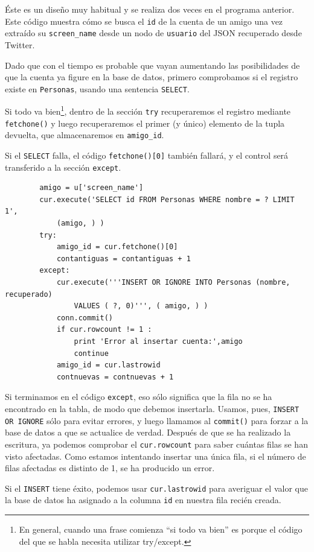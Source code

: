Éste es un diseño muy habitual y se realiza dos veces en el programa anterior.
Este código muestra cómo se busca el {\tt id} de la
cuenta de un amigo una vez extraído su \verb"screen_name"
desde un nodo de {\tt usuario} del JSON recuperado desde Twitter.

Dado que con el tiempo es probable que vayan aumentando las posibilidades de que la cuenta
ya figure en la base de datos, primero comprobamos si el registro
existe en {\tt Personas}, usando una sentencia {\tt SELECT}.

Si todo va bien\footnote{En general, cuando una frase comienza
``si todo va bien''	es porque el código del que se habla necesita
utilizar try/except.}, dentro de la sección {\tt try} recuperaremos el
registro mediante {\tt fetchone()} y luego recuperaremos el
primer (y único) elemento de la tupla devuelta, que almacenaremos en
\verb"amigo_id".

Si el {\tt SELECT} falla, el código {\tt fetchone()[0]} también fallará,
y el control será transferido a la sección {\tt except}.

\beforeverb
\begin{verbatim}
        amigo = u['screen_name']
        cur.execute('SELECT id FROM Personas WHERE nombre = ? LIMIT 1',
            (amigo, ) )
        try:
            amigo_id = cur.fetchone()[0]
            contantiguas = contantiguas + 1
        except:
            cur.execute('''INSERT OR IGNORE INTO Personas (nombre, recuperado) 
                VALUES ( ?, 0)''', ( amigo, ) )
            conn.commit()
            if cur.rowcount != 1 :
                print 'Error al insertar cuenta:',amigo
                continue
            amigo_id = cur.lastrowid
            contnuevas = contnuevas + 1
\end{verbatim}
\afterverb
%
Si terminamos en el código {\tt except}, eso sólo significa que la fila
no se ha encontrado en la tabla, de modo que debemos insertarla. Usamos, pues,
{\tt INSERT OR IGNORE} sólo para evitar errores, y luego llamamos al {\tt commit()} para
forzar a la base de datos a que se actualice de verdad. Después de que se ha realizado la escritura,
ya podemos comprobar el {\tt cur.rowcount} para saber cuántas filas se han visto afectadas. Como
estamos intentando insertar una única fila, si el número de
filas afectadas es distinto de 1, se ha producido un error.

Si el {\tt INSERT} tiene éxito, podemos usar {\tt cur.lastrowid}
para averiguar el valor que la base de datos ha asignado a la columna {\tt id}
en nuestra fila recién creada.

